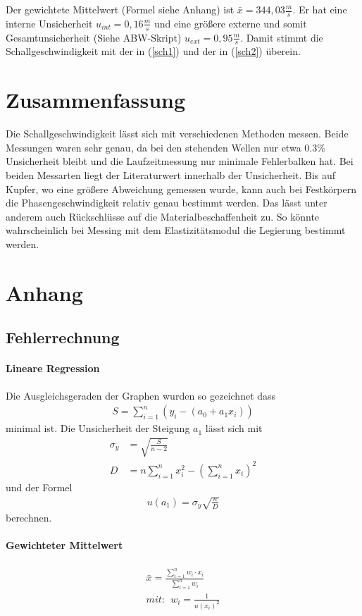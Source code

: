 \documentclass[11pt, a4paper]{article}
\begin{document}
    Der gewichtete Mittelwert (Formel siehe Anhang) ist $\bar{x} = 344,03 \frac{m}{s}$. Er hat eine 
    interne Unsicherheit $u_{int} = 0,16\frac{m}{s}$ und eine größere externe und somit Gesamtunsicherheit (Siehe ABW-Skript) $u_{ext} = 0,95\frac{m}{s}$.
    Damit stimmt die Schallgeschwindigkeit mit der in (\ref{sch1}) und der in (\ref{sch2}) überein.


    \section{Zusammenfassung}
    Die Schallgeschwindigkeit lässt sich mit verschiedenen Methoden messen. Beide Messungen waren sehr genau,
    da bei den stehenden Wellen nur etwa 0.3\% Unsicherheit bleibt und die Laufzeitmessung nur minimale Fehlerbalken hat.
    Bei beiden Messarten liegt der 
    Literaturwert innerhalb der Unsicherheit. Bis auf Kupfer, wo eine größere Abweichung gemessen wurde, kann auch 
    bei Festkörpern die Phasengeschwindigkeit relativ genau bestimmt werden. Das lässt unter anderem auch Rückschlüsse auf die
    Materialbeschaffenheit zu. So könnte  wahrscheinlich bei Messing mit dem Elastizitätsmodul die Legierung bestimmt werden.
   
    \section{Anhang}
    \subsection{Fehlerrechnung}
    \paragraph{Lineare Regression}
    Die Ausgleichsgeraden der Graphen wurden so gezeichnet dass
    \begin{align}
        S=\sum_{i=1}^n(y_i - (a_0 + a_1 x_i))
    \end{align}
    minimal ist. Die Unsicherheit der Steigung $a_1$ lässt sich mit
    \begin{align}
        \sigma_y &= \sqrt{\frac{S}{n-2}} \\
        D &= n \sum_{i=1}^n x_i^2 - \left( \sum_{i=1}^n x_i \right)^2
    \end{align}
    und der Formel
    \begin{align}
        u(a_1) = \sigma_y \sqrt{\frac{n}{D}}
    \end{align}
    berechnen.

    \paragraph{Gewichteter Mittelwert}
    \begin{align}
        \bar{x} = \frac{\sum_{i=1}^n w_i \cdot x_i}{\sum_{i=1}^n w_i} \\
        mit: \ \ w_i = \frac{1}{u(x_i)^2}
    \end{align}
\end{document}
